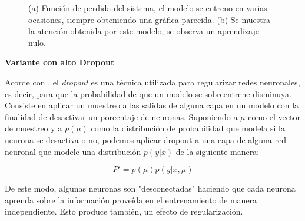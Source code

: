 \begin{figure}[H]
    \centering
    \caption{(a) Función de perdida del sistema, el modelo se entreno en varias ocasiones, siempre obteniendo una gráfica parecida. (b) Se muestra la atención obtenida por este modelo, se observa un aprendizaje nulo.}
    \label{fig:gru-bad}
\end{figure}


\vspace{1em}
\textbf{Variante con alto Dropout}
\vspace{1em}

Acorde con \cite{deeplearningbook}, el \textit{dropout} es una técnica utilizada para regularizar redes neuronales, es decir, para que la probabilidad de que un modelo se sobreentrene disminuya. Consiste en aplicar un muestreo a las salidas de alguna capa en un modelo con la finalidad de desactivar un porcentaje de neuronas. Suponiendo a $\mu$ como el vector de muestreo y a $p(\mu)$ como la distribución de probabilidad que modela si la neurona se desactiva o no, podemos aplicar dropout a una capa de alguna red neuronal que modele una distribución $p(y|x)$ de la siguiente manera:

\begin{equation}
    P' = p(\mu)p(y|x,\mu)
\end{equation}

De este modo, algunas neuronas \cite{harvard} son "desconectadas" haciendo que cada neurona aprenda sobre la información proveída en el entrenamiento de manera independiente. Esto produce también, un efecto de regularización.

